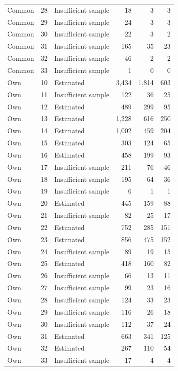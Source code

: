 \begin{longtable}{lllrrr}
Common & 28 & Insufficient sample & 18 & 3 & 3 \\
Common & 29 & Insufficient sample & 24 & 3 & 3 \\
Common & 30 & Insufficient sample & 22 & 3 & 2 \\
Common & 31 & Insufficient sample & 165 & 35 & 23 \\
Common & 32 & Insufficient sample & 46 & 2 & 2 \\
Common & 33 & Insufficient sample & 1 & 0 & 0 \\
Own & 10 & Estimated & 3,434 & 1,814 & 603 \\
Own & 11 & Insufficient sample & 122 & 36 & 25 \\
Own & 12 & Estimated & 489 & 299 & 95 \\
Own & 13 & Estimated & 1,228 & 616 & 250 \\
Own & 14 & Estimated & 1,002 & 459 & 204 \\
Own & 15 & Estimated & 303 & 124 & 65 \\
Own & 16 & Estimated & 458 & 199 & 93 \\
Own & 17 & Insufficient sample & 211 & 76 & 46 \\
Own & 18 & Insufficient sample & 195 & 64 & 36 \\
Own & 19 & Insufficient sample & 6 & 1 & 1 \\
Own & 20 & Estimated & 445 & 159 & 88 \\
Own & 21 & Insufficient sample & 82 & 25 & 17 \\
Own & 22 & Estimated & 752 & 285 & 151 \\
Own & 23 & Estimated & 856 & 475 & 152 \\
Own & 24 & Insufficient sample & 89 & 19 & 15 \\
Own & 25 & Estimated & 418 & 160 & 82 \\
Own & 26 & Insufficient sample & 66 & 13 & 11 \\
Own & 27 & Insufficient sample & 99 & 23 & 16 \\
Own & 28 & Insufficient sample & 124 & 33 & 23 \\
Own & 29 & Insufficient sample & 116 & 26 & 18 \\
Own & 30 & Insufficient sample & 112 & 37 & 24 \\
Own & 31 & Estimated & 663 & 341 & 125 \\
Own & 32 & Estimated & 267 & 110 & 54 \\
Own & 33 & Insufficient sample & 17 & 4 & 4 \\
\end{longtable}
\endgroup
{}
